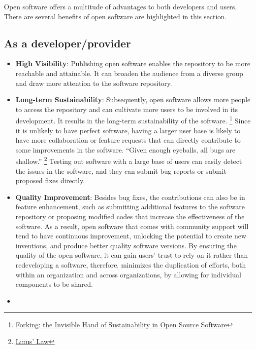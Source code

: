 \documentclass[
  letterpaper,
  DIV=11,
  numbers=noendperiod]{scrreport}
\begin{document}
Open software offers a multitude of advantages to both developers and
users. There are several benefits of open software are highlighted in
this section.

\hypertarget{as-a-developerprovider}{%
\subsection{As a developer/provider}\label{as-a-developerprovider}}

\begin{itemize}
\item
  \textbf{High Visibility}: Publishing open software enables the
  repository to be more reachable and attainable. It can broaden the
  audience from a diverse group and draw more attention to the software
  repository.
\item
  \textbf{Long-term Sustainability}: Subsequently, open software allows
  more people to access the repository and can cultivate more users to
  be involved in its development. It results in the long-term
  sustainability of the software. \footnote{\href{https://helda.helsinki.fi/handle/10138/157663}{Forking:
    the Invisible Hand of Sustainability in Open Source Software}} Since
  it is unlikely to have perfect software, having a larger user base is
  likely to have more collaboration or feature requests that can
  directly contribute to some improvements in the software. ``Given
  enough eyeballs, all bugs are shallow.'' \footnote{\href{http://www.catb.org/~esr/writings/cathedral-bazaar/cathedral-bazaar/}{Linus'
    Law}} Testing out software with a large base of users can easily
  detect the issues in the software, and they can submit bug reports or
  submit proposed fixes directly.
\item
  \textbf{Quality Improvement}: Besides bug fixes, the contributions can
  also be in feature enhancement, such as submitting additional features
  to the software repository or proposing modified codes that increase
  the effectiveness of the software. As a result, open software that
  comes with community support will tend to have continuous improvement,
  unlocking the potential to create new inventions, and produce better
  quality software versions. By ensuring the quality of the open
  software, it can gain users' trust to rely on it rather than
  redeveloping a software, therefore, minimizes the duplication of
  efforts, both within an organization and across organizations, by
  allowing for individual components to be shared.
\item

\end{itemize}
\end{document}
